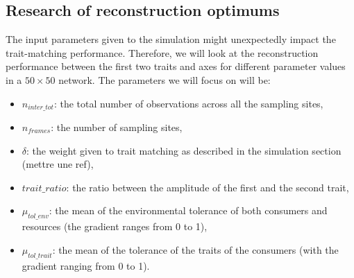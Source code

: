 \subsection{Research of reconstruction optimums}

The input parameters given to the simulation might unexpectedly impact the trait-matching performance. Therefore, we will look at the reconstruction performance between the first two traits and axes for different parameter values in a $50\times50$ network. The parameters we will focus on will be:
\begin{itemize}
    \item $n_{inter\_tot}$: the total number of observations across all the sampling sites,
    \item $n_{frames}$: the number of sampling sites,
    \item $\delta$: the weight given to trait matching as described in the simulation section (mettre une ref),
    \item $trait\_ratio$: the ratio between the amplitude of the first and the second trait,
    \item $\mu_{tol\_env}$: the mean of the environmental tolerance of both consumers and resources (the gradient ranges from 0 to 1),
    \item $\mu_{tol\_trait}$: the mean of the tolerance of the traits of the consumers (with the gradient ranging from 0 to 1).
\end{itemize}


\begin{table}[H]
    \centering
    \caption{Parameters for the experimentation}
    \label{parameter_table}
\end{table}



